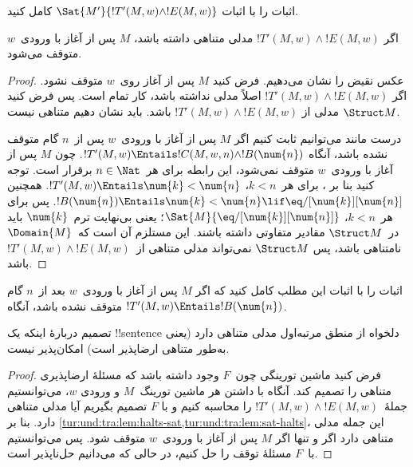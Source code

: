 \documentclass[../../../include/open-logic-section]{subfiles}
\begin{document}
\begin{prob}
  اثبات  را با اثبات
  $\Sat{M'}{!T'(M,w)\land !E(M,w)}$ کامل کنید.
\end{prob}

\begin{lem}
  اگر $!T'(M,w)\land !E(M,w)$ مدلی متناهی داشته باشد، $M$ پس از آغاز
  با ورودی~$w$ متوقف می‌شود.
\end{lem}

\begin{proof}
  عکس نقیض را نشان می‌دهیم. فرض کنید $M$ پس از آغاز روی~$w$ متوقف
  نشود. اگر $!T'(M,w)\land !E(M,w)$ اصلاً مدلی نداشته باشد، کار تمام
  است. پس فرض کنید $\Struct M$ مدلی از
  $!T'(M,w)\land !E(M,w)$ باشد. باید نشان دهیم متناهی نیست.

  درست مانند  می‌توانیم ثابت کنیم اگر $M$ پس
  از آغاز با ورودی~$w$ پس از~$n$ گام متوقف نشده باشد، آنگاه
  $!T'(M,w)\Entails !C(M,w,n)\land !B(\num{n})$. چون $M$ پس از آغاز
  با ورودی~$w$ متوقف نمی‌شود، این رابطه برای هر~$n\in\Nat$ برقرار
  است. توجه کنید بنا بر ، برای هر~$k<n$،
  $!T'(M,w)\Entails\num{k}<\num{n}$. همچنین
  $!B(\num{n})\Entails\num{k}<\num{n}\lif
  \eq/[\num{k}][\num{n}]$. پس برای هر~$k<n$،
  $\Sat{M}{\eq/[\num{k}][\num{n}]}$؛ یعنی بی‌نهایت ترم~$\num{k}$
  باید در~$\Struct M$ مقادیر متفاوتی داشته باشند. این مستلزم آن است
  که~$\Domain{M}$ نامتناهی باشد، پس $\Struct M$ نمی‌تواند مدلی متناهی
  از~$!T'(M,w)\land !E(M,w)$ باشد.
\end{proof}

\begin{prob}
  اثبات  را با اثبات این مطلب
  کامل کنید که اگر $M$ پس از آغاز با ورودی~$w$ بعد از~$n$ گام متوقف
  نشده باشد، آنگاه $!T'(M,w)\Entails !B(\num{n})$.
\end{prob}

\begin{thm}
  تصمیم دربارهٔ اینکه یک !!{sentence}ٔ دلخواه از منطق مرتبه‌اول مدلی
  متناهی دارد (یعنی به‌طور متناهی ارضاپذیر است) امکان‌پذیر نیست.
\end{thm}

\begin{proof}
  فرض کنید ماشین تورینگی چون~$F$ وجود داشته باشد که مسئلهٔ ارضاپذیری
  متناهی را تصمیم کند. آنگاه با داشتن هر ماشین تورینگ~$M$ و ورودی
  $w$، می‌توانستیم جملهٔ~$!T'(M,w)\land !E(M,w)$ را محاسبه کنیم و با
  $F$ تصمیم بگیریم آیا مدلی متناهی دارد. بنا بر
  \cref{tur:und:tra:lem:halts-sat,tur:und:tra:lem:sat-halts}، این جمله
  مدلی متناهی دارد اگر و تنها اگر $M$ پس از آغاز با ورودی~$w$ متوقف
  شود. پس می‌توانستیم با~$F$ مسئلهٔ توقف را حل کنیم، در حالی که
  می‌دانیم حل‌ناپذیر است.
\end{proof}
\end{document}

